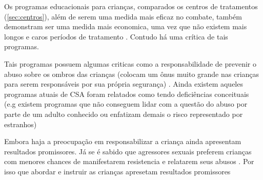 
Os programas educacionais para crianças, comparados os centros de tratamentos (\autoref{sec:centros}), além de serem uma medida mais eficaz no combate, também demonstram ser uma medida mais economica, uma vez que não existem mais longos e caros períodos de tratamento \cite{mariscal2003programa}. Contudo há uma crítica de tais programas.


Tais programas possuem algumas criticas como a responsabilidade de prevenir o abuso sobre os ombros das crianças (colocam um ônus muito grande nas crianças para serem responsáveis por sua própria segurança) \cite{dip2016advancing}. Ainda existem aqueles programas atuais de CSA foram relatados como tendo deficiências conceituais (e.g existem programas que não conseguem lidar com a questão do abuso por parte de um adulto conhecido ou enfatizam demais o risco representado por estranhos) \cite{sanderson2004child} 

Embora haja a preocupação em responsabilizar a criança ainda apresentam resultados promissores. Já se é sabido que agressores sexuais preferem crianças com menores chances de manifestarem resistencia e relatarem seus abusos \cite{budin1989sex}. Por isso que abordar e instruir as crianças apresetam resultados promissores \cite{barron2008school, finkelhor2009prevention}





